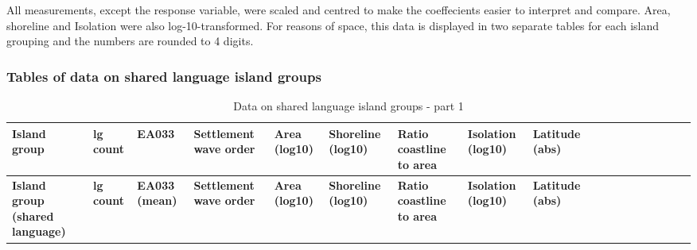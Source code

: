 \documentclass[a4paper,10pt]{article} %
\begin{document}
All measurements, except the response variable, were scaled and centred to make the coeffecients easier to interpret and compare. Area, shoreline and Isolation were also log-10-transformed. For reasons of space, this data is displayed in two separate tables for each island grouping and the numbers are rounded to 4 digits.

\subsubsection{Tables of data on shared language island groups}
\label{shared_language_groups}

\begin{landscape}
\begin{longtable}{| p{2.6cm} |  p{1cm} | p{1.2cm}  | p{1.9cm}  | p{1.7cm}  | p{1.7cm}  | p{1.7cm}  | p{1.6cm} | p{1.5cm}  | p{1cm} | p{1cm}  | p{1cm}  |p{1cm}  | p{1cm}    | p{1cm}    | p{1cm}    | p{1cm}    |p{1cm}    |}

\caption{{Data on shared language island groups - part 1}} 
\label{shared_language_groups_table} \\
\hline
\textbf{Island group} & \textbf{lg  count } & \textbf{EA033} & \textbf{Settlement wave order} & \textbf{Area (log10)} & \textbf{Shoreline (log10)} & \textbf{Ratio coastline to  area} & \textbf{Isolation (log10)} & \textbf{Latitude (abs)}  \\ \hline

\endfirsthead

\hline
\textbf{Island group (shared language)} & \textbf{lg  count } & \textbf{EA033 (mean)} & \textbf{Settlement wave order} & \textbf{Area (log10)} & \textbf{Shoreline (log10)} & \textbf{Ratio coastline to  area} & \textbf{Isolation (log10)} & \textbf{Latitude (abs)}  \\ \hline
\endhead


\end{longtable}
\end{landscape}
\end{document}
